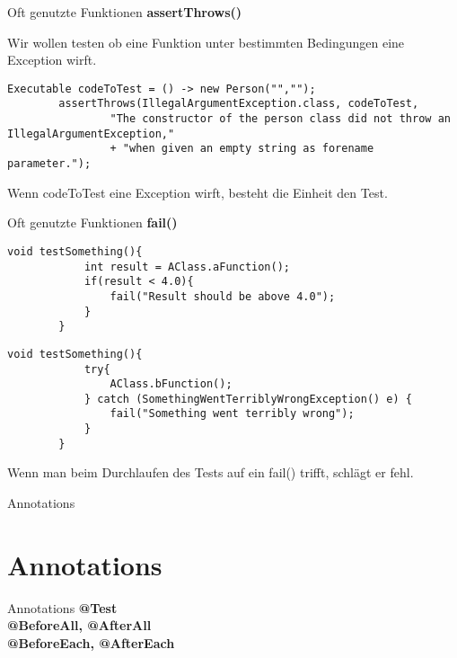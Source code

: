 \documentclass[10pt]{beamer}
\begin{document}
\begin{frame}[fragile]{Oft genutzte Funktionen}
     \textcolor{mygreen}{\textbf{assertThrows()}}
    
    Wir wollen testen ob eine Funktion unter bestimmten Bedingungen eine Exception wirft.

    \begin{lstlisting}[basicstyle=\ttfamily\scriptsize,gobble=8]
        Executable codeToTest = () -> new Person("","");
    	assertThrows(IllegalArgumentException.class, codeToTest,
    			"The constructor of the person class did not throw an IllegalArgumentException,"
    			+ "when given an empty string as forename parameter.");
    \end{lstlisting}
    Wenn codeToTest eine Exception wirft, besteht die Einheit den Test.
\end{frame}

\begin{frame}[fragile]{Oft genutzte Funktionen}
     \textcolor{mygreen}{\textbf{fail()}}
    \begin{lstlisting}[basicstyle=\ttfamily\scriptsize,gobble=8]
        void testSomething(){
			int result = AClass.aFunction();
			if(result < 4.0){
				fail("Result should be above 4.0");
			}
		}     
    \end{lstlisting}
    \begin{lstlisting}[basicstyle=\ttfamily\scriptsize,gobble=8]
        void testSomething(){
			try{
				AClass.bFunction();
			} catch (SomethingWentTerriblyWrongException() e) {
				fail("Something went terribly wrong");
			}
		}     
    \end{lstlisting}
    Wenn man beim Durchlaufen des Tests auf ein fail() trifft, schlägt er fehl.
\end{frame}

\begin{frame}[fragile]{Annotations}
    \section{Annotations}
\end{frame}

\begin{frame}[fragile]{Annotations}
    \textcolor{mygreen}{\textbf{@Test}}\\
    \textcolor{mygreen}{\textbf{@BeforeAll, @AfterAll}}\\
    \textcolor{mygreen}{\textbf{@BeforeEach, @AfterEach}}\\
\end{frame}
\end{document}
